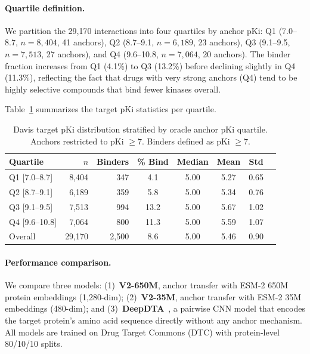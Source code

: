 \paragraph{Quartile definition.}
We partition the 29,170 interactions into four quartiles by anchor pKi: Q1 (7.0--8.7, $n = 8{,}404$, 41 anchors), Q2 (8.7--9.1, $n = 6{,}189$, 23 anchors), Q3 (9.1--9.5, $n = 7{,}513$, 27 anchors), and Q4 (9.6--10.8, $n = 7{,}064$, 20 anchors).
The binder fraction increases from Q1 (4.1\%) to Q3 (13.2\%) before declining slightly in Q4 (11.3\%), reflecting the fact that drugs with very strong anchors (Q4) tend to be highly selective compounds that bind fewer kinases overall.

Table~\ref{tab:davis_quartile_dist} summarizes the target pKi statistics per quartile.

\begin{table}[t]
    \centering
    \caption{Davis target pKi distribution stratified by oracle anchor pKi quartile. Anchors restricted to pKi $\geq 7$. Binders defined as pKi $\geq 7$.}
    \label{tab:davis_quartile_dist}
    \begin{tabular}{lrrccccc}
        \toprule
        Quartile & $n$ & Binders & \% Bind & Median & Mean & Std \\
        \midrule
        Q1 [7.0--8.7] & 8,404  & 347   & 4.1  & 5.00 & 5.27 & 0.65 \\
        Q2 [8.7--9.1] & 6,189  & 359   & 5.8  & 5.00 & 5.34 & 0.76 \\
        Q3 [9.1--9.5] & 7,513  & 994   & 13.2 & 5.00 & 5.67 & 1.02 \\
        Q4 [9.6--10.8] & 7,064 & 800   & 11.3 & 5.00 & 5.59 & 1.07 \\
        \midrule
        Overall & 29,170 & 2,500 & 8.6 & 5.00 & 5.46 & 0.90 \\
        \bottomrule
    \end{tabular}
\end{table}

\paragraph{Performance comparison.}
We compare three models: (1)~\textbf{V2-650M}, anchor transfer with ESM-2 650M protein embeddings (1,280-dim); (2)~\textbf{V2-35M}, anchor transfer with ESM-2 35M embeddings (480-dim); and (3)~\textbf{DeepDTA}~\citep{ozturk2018deepdta}, a pairwise CNN model that encodes the target protein's amino acid sequence directly without any anchor mechanism.
All models are trained on Drug Target Commons (DTC) with protein-level 80/10/10 splits.

